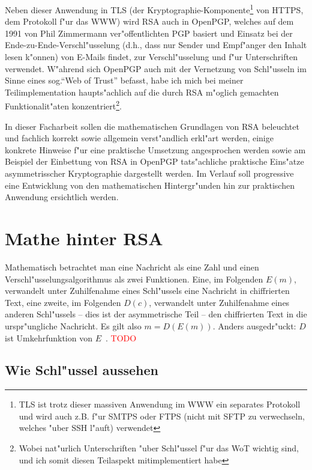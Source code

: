 \documentclass[12pt]{article}
\newcommand{\todo}[1]{\textcolor{red}{\mbox{TODO}}\marginpar{\textcolor{red}{#1}}}
\begin{document}
Neben dieser Anwendung in TLS (der Kryptographie-Komponente\footnote{
TLS ist trotz dieser massiven Anwendung im WWW ein separates Protokoll und wird auch z.B. f"ur SMTPS oder FTPS (nicht mit SFTP zu verwechseln, welches "uber SSH l"auft) verwendet}
von HTTPS, dem Protokoll f"ur das WWW) wird RSA auch in OpenPGP,
welches auf dem 1991 von Phil Zimmermann ver"offentlichten PGP basiert und Einsatz bei der Ende-zu-Ende-Verschl"usselung
(d.h., dass nur Sender und Empf"anger den Inhalt lesen k"on\-nen)
von E-Mails findet, zur Verschl"usselung und f"ur Unterschriften verwendet.
W"ah\-rend sich OpenPGP auch mit der Vernetzung von Schl"usseln im Sinne eines sog.\@ "`Web of Trust"' befasst,
habe ich mich bei meiner Teilimplementation haupts"achlich auf die durch RSA m"oglich gemachten
Funktionalit"aten konzentriert\footnote{Wobei nat"urlich Unterschriften "uber Schl"ussel f"ur das WoT wichtig sind, und ich somit diesen Teilaspekt mitimplementiert habe}.

In dieser Facharbeit sollen die mathematischen Grundlagen von RSA beleuchtet und
fachlich korrekt sowie allgemein verst"andlich erkl"art werden,
einige konkrete Hinweise f"ur eine praktische Umsetzung angesprochen werden
sowie am Beispiel der Einbettung von RSA in OpenPGP tats"achliche praktische
Eins"atze asymmetrisscher Kryptographie dargestellt werden.
Im Verlauf soll progressive eine Entwicklung von den mathematischen Hintergr"unden
hin zur praktischen Anwendung ersichtlich werden.

\section{Mathe hinter RSA}

Mathematisch betrachtet man eine Nachricht als eine Zahl und einen
Ver\-schl"us\-sel\-ungs\-al\-go\-rith\-mus als zwei Funktionen.
Eine, im Folgenden $E(m)$, verwandelt unter Zuhilfenahme eines Schl"ussels eine
Nachricht in chiffrierten Text, eine zweite, im Folgenden $D(c)$,
verwandelt unter Zuhilfenahme eines anderen Schl"ussels -- dies ist der asymmetrische Teil --
den chiffrierten Text in die urspr"ungliche Nachricht.
Es gilt also $m = D(E(m))$.
Anders ausgedr"uckt: $D$ ist Umkehrfunktion von $E$~\cite{rsa}.
\todo{Hier irgendwo auch Unterschriften erw"ahnen?}

\subsection{Wie Schl"ussel aussehen}
\label{subsec:rsa:keys}
\end{document}
